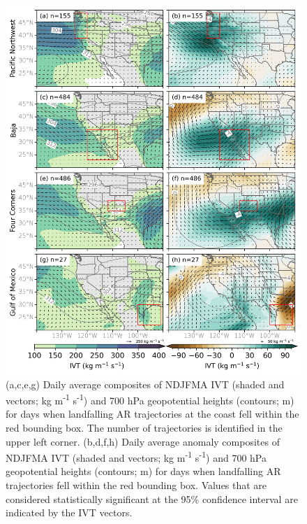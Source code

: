 \documentclass[draft]{agujournal2019}
\begin{document}
\begin{figure}
\noindent\includegraphics[width=\textwidth, height=\textheight, keepaspectratio]{fig6.png}

\caption{(a,c,e,g) Daily average composites of NDJFMA IVT (shaded and vectors; kg m\textsuperscript{-1} s\textsuperscript{-1}) and 700 hPa geopotential heights (contours; m) for days when landfalling AR trajectories at the coast fell within the red bounding box. The number of trajectories is identified in the upper left corner. (b,d,f,h) Daily average anomaly composites of NDJFMA IVT (shaded and vectors; kg m\textsuperscript{-1} s\textsuperscript{-1}) and 700 hPa geopotential heights (contours; m) for days when landfalling AR trajectories fell within the red bounding box. Values that are considered statistically significant at the 95\% confidence interval are indicated by the IVT vectors.}
\label{fig:composites_NDJFMA}
\end{figure}
\end{document}
